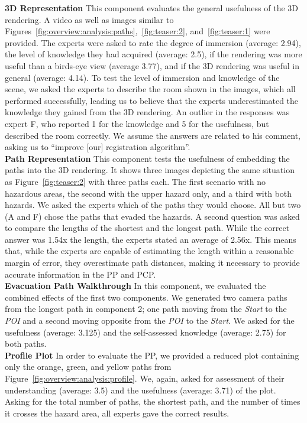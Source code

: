 \documentclass[conference,10pt,letter]{IEEEtran}
\begin{document}
\noindent \textbf{3D Representation} This component evaluates the general usefulness of the 3D rendering. A video as well as images similar to Figures~\ref{fig:overview:analysis:paths},~\ref{fig:teaser:2}, and~\ref{fig:teaser:1} were provided. The experts were asked to rate the degree of immersion (average: 2.94), the level of knowledge they had acquired (average: 2.5), if the rendering was more useful than a birds-eye view (average 3.77), and if the 3D rendering was useful in general (average: 4.14). To test the level of immersion and knowledge of the scene, we asked the experts to describe the room shown in the images, which all performed successfully, leading us to believe that the experts underestimated the knowledge they gained from the 3D rendering. An outlier in the responses was expert F, who reported 1 for the knowledge and 5 for the usefulness, but described the room correctly. We assume the answers are related to his comment, asking us to ``improve [our] registration algorithm''. \\
%
\noindent \textbf{Path Representation} This component tests the usefulness of embedding the paths into the 3D rendering. It shows three images depicting the same situation as Figure~\ref{fig:teaser:2} with three paths each. The first scenario with no hazardous areas, the second with the upper hazard only, and a third with both hazards. We asked the experts which of the paths they would choose. All but two (A and F) chose the paths that evaded the hazards. A second question was asked to compare the lengths of the shortest and the longest path. While the correct answer was 1.54x the length, the experts stated an average of 2.56x. This means that, while the experts are capable of estimating the length within a reasonable margin of error, they overestimate path distances, making it necessary to provide accurate information in the PP and PCP. \\
%
\noindent \textbf{Evacuation Path Walkthrough} In this component, we evaluated the combined effects of the first two components. We generated two camera paths from the longest path in component 2; one path moving from the \emph{Start} to the \emph{POI} and a second moving opposite from the \emph{POI} to the \emph{Start}. We asked for the usefulness (average: 3.125) and the self-assessed knowledge (average: 2.75) for both paths. \\
%
\noindent \textbf{Profile Plot} In order to evaluate the PP, we provided a reduced plot containing only the orange, green, and yellow paths from Figure~\ref{fig:overview:analysis:profile}. We, again, asked for assessment of their understanding (average: 3.5) and the usefulness (average: 3.71) of the plot. Asking for the total number of paths, the shortest path, and the number of times it crosses the hazard area, all experts gave the correct results. \\
\end{document}
